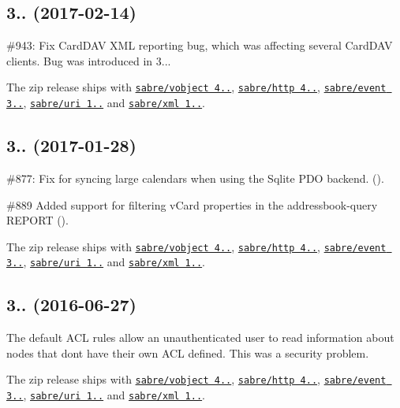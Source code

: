 \subsection*{3.. (2017-\/02-\/14) }


\begin{DoxyItemize}
\item \#943\+: Fix Card\+D\+AV X\+ML reporting bug, which was affecting several Card\+D\+AV clients. Bug was introduced in 3...
\item The zip release ships with \href{http://sabre.io/vobject/}{\tt sabre/vobject 4..}, \href{http://sabre.io/http/}{\tt sabre/http 4..}, \href{http://sabre.io/event/}{\tt sabre/event 3..}, \href{http://sabre.io/uri/}{\tt sabre/uri 1..} and \href{http://sabre.io/xml/}{\tt sabre/xml 1..}.
\end{DoxyItemize}

\subsection*{3.. (2017-\/01-\/28) }


\begin{DoxyItemize}
\item \#877\+: Fix for syncing large calendars when using the Sqlite P\+DO backend. ().
\item \#889 Added support for filtering v\+Card properties in the addressbook-\/query R\+E\+P\+O\+RT ().
\item The zip release ships with \href{http://sabre.io/vobject/}{\tt sabre/vobject 4..}, \href{http://sabre.io/http/}{\tt sabre/http 4..}, \href{http://sabre.io/event/}{\tt sabre/event 3..}, \href{http://sabre.io/uri/}{\tt sabre/uri 1..} and \href{http://sabre.io/xml/}{\tt sabre/xml 1..}.
\end{DoxyItemize}

\subsection*{3.. (2016-\/06-\/27) }


\begin{DoxyItemize}
\item The default A\+CL rules allow an unauthenticated user to read information about nodes that don\textquotesingle{}t have their own A\+CL defined. This was a security problem.
\item The zip release ships with \href{http://sabre.io/vobject/}{\tt sabre/vobject 4..}, \href{http://sabre.io/http/}{\tt sabre/http 4..}, \href{http://sabre.io/event/}{\tt sabre/event 3..}, \href{http://sabre.io/uri/}{\tt sabre/uri 1..} and \href{http://sabre.io/xml/}{\tt sabre/xml 1..}.
\end{DoxyItemize}

